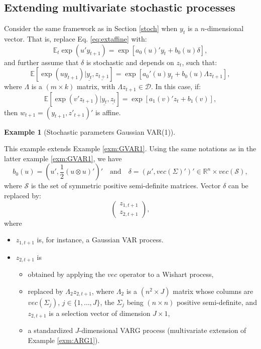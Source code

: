 \documentclass[
  12pt,
]{book}
\providecommand{\tightlist}{%
  \setlength{\itemsep}{0pt}\setlength{\parskip}{0pt}}
\theoremstyle{definition}
\theoremstyle{definition}
\newtheorem{example}{Example}[chapter]
\theoremstyle{definition}
\theoremstyle{definition}
\theoremstyle{remark}
\begin{document}
\hypertarget{extending-multivariate-stochastic-processes}{%
\subsection{Extending multivariate stochastic processes}\label{extending-multivariate-stochastic-processes}}

Consider the same framework as in Section \ref{stoch} when \(y_t\) is a \(n\)-dimensional vector. That is, replace Eq. \eqref{eq:extaffine} with:
\begin{equation}
\mathbb{E}_t   \exp(u' y_{t+1}) = \exp[a_0(u)'y_t+b_0(u)\delta],\label{eq:Multiextaffine}
\end{equation}
and further assume that \(\delta\) is stochastic and depends on \(z_t\), such that:
\[
\mathbb{E}[\exp(u y_{t+1})|\underline{y_t}, \underline{z_{t+1}}] = \exp[a_0'(u)y_t+b_0(u)\Lambda z_{t+1}],
\]
where \(\Lambda\) is a \((m\times k)\) matrix, with \(\Lambda z_{t+1} \in \mathcal{D}\). In this case, if:
\[
\mathbb{E}[\exp(v' z_{t+1})|\underline{y_t}, \underline{z_{t}}] = \exp[a_1(v)'z_t+b_1(v)],
\]
then \(w_{t+1} = (y_{t+1}, z'_{t+1})'\) is affine.

\begin{example}[Stochastic parameters Gaussian VAR(1)]
\protect\hypertarget{exm:RSVAR}{}\label{exm:RSVAR}

This example extends Example \ref{exm:GVAR1}. Using the same notations as in the latter example \ref{exm:GVAR1}, we have
\[
b_0(u) = \left(u', \frac{1}{2} (u \otimes u)'\right)' \quad \mbox{and} \quad\delta = (\mu', vec(\Sigma)')' \in \mathbb{R}^n \times vec(\mathcal{S}),
\]
where \(\mathcal{S}\) is the set of symmetric positive semi-definite matrices. Vector \(\delta\) can be replaced by:
\[
\left( \begin{array}{l} z_{1,t+1}
\\ z_{2,t+1}
\end{array} \right),
\]
where

\begin{itemize}
\tightlist
\item
  \(z_{1,t+1}\) is, for instance, a Gaussian VAR process.
\item
  \(z_{2,t+1}\) is

  \begin{itemize}
  \tightlist
  \item
    obtained by applying the \(vec\) operator to a Wishart process,
  \item
    replaced by \(\Lambda_2 z_{2,t+1}\), where \(\Lambda_2\) is a \((n^2 \times J)\) matrix whose columns are \(vec(\Sigma_j)\), \(j \in \{1,\dots,J\}\), the \(\Sigma_j\) being \((n \times n)\) positive semi-definite, and \(z_{2,t+1}\) is a selection vector of dimension \(J \times 1\),
  \item
    a standardized \(J\)-dimensional VARG process (multivariate extension of Example \ref{exm:ARG1}).
  \end{itemize}
\end{itemize}

\end{example}
\end{document}
